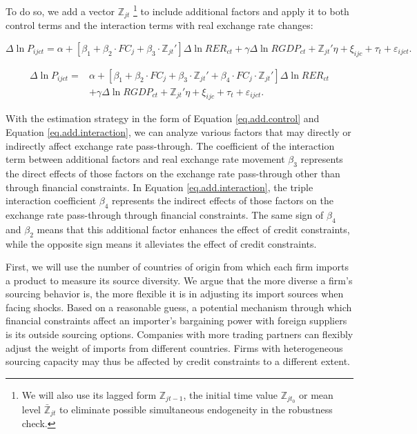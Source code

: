 \documentclass[12pt]{article}
\begin{document}
To do so, we add a vector $\mathbb{Z}_{jt}$ \footnote{We will also use its lagged form $\mathbb{Z}_{jt-1}$, the initial time value $\mathbb{Z}_{jt_0}$ or mean level $\bar{\mathbb{Z}}_{jt}$ to eliminate possible simultaneous endogeneity in the robustness check.} to include additional factors and apply it to both control terms and the interaction terms with real exchange rate changes: 

\begin{equation}
	\Delta \ln P_{ijct}=\alpha+[\beta_{1}+ \beta_{2} \cdot FC_{j}+\beta_{3} \cdot {\mathbb{Z}_{jt}}'] \Delta \ln RER_{ct} +\gamma \Delta \ln RGDP_{ct}+ {\mathbb{Z}_{jt}}' \eta+\xi_{ijc}+\tau_{t} +\varepsilon_{ijct}.
	\label{eq.add.control}
\end{equation}

\begin{equation}
	\begin{aligned}
	\Delta \ln P_{ijct}=&\alpha+[\beta_{1}+ \beta_{2} \cdot FC_{j}+\beta_{3} \cdot {\mathbb{Z}_{jt}}'+\beta_{4} \cdot FC_{j} \cdot {\mathbb{Z}_{jt}}'] \Delta \ln RER_{ct} \\ &+\gamma \Delta \ln RGDP_{ct}+ {\mathbb{Z}_{jt}}' \eta+\xi_{ijc}+\tau_{t} +\varepsilon_{ijct}.
	\end{aligned}	
	\label{eq.add.interaction}
\end{equation}

With the estimation strategy in the form of Equation \ref{eq.add.control} and Equation \ref{eq.add.interaction}, we can analyze various factors that may directly or indirectly affect exchange rate pass-through. The coefficient of the interaction term between additional factors and real exchange rate movement $\beta_3$ represents the direct effects of those factors on the exchange rate pass-through other than through financial constraints. In Equation \ref{eq.add.interaction}, the triple interaction coefficient $\beta_4$ represents the indirect effects of those factors on the exchange rate pass-through through financial constraints. The same sign of $\beta_4$ and $\beta_2$ means that this additional factor enhances the effect of credit constraints, while the opposite sign means it alleviates the effect of credit constraints. 

First, we will use the number of countries of origin from which each firm imports a product to measure its source diversity. We argue that the more diverse a firm's sourcing behavior is, the more flexible it is in adjusting its import sources when facing shocks. Based on a reasonable guess, a potential mechanism through which financial constraints affect an importer's bargaining power with foreign suppliers is its outside sourcing options. Companies with more trading partners can flexibly adjust the weight of imports from different countries. Firms with heterogeneous sourcing capacity may thus be affected by credit constraints to a different extent. 
\end{document}
